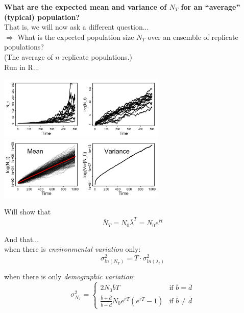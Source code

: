 \documentclass{article}
\newcommand{\note}[1]{\colorbox{gray!20}{#1}}
\newcommand{\ind}{\-\hspace{1cm}}
\begin{document}
\textbf{What are the expected mean and variance of $N_T$ for an ``average'' (typical) population?}\\
That is, we will now ask a different question...\\
\ind $\Rightarrow$ What is the expected population size $N_T$ over an ensemble of replicate populations?\\
\ind (The average of $n$ replicate populations.)\\
\note{Run in R...}
\begin{center}
 \includegraphics[width=8cm]{figs/image1}\\
 \includegraphics[width=8cm]{figs/image2}
\end{center}

Will show that
\begin{equation*}
	\bar{N}_T = N_0 \bar{\lambda}^T = N_0 e^{\bar{r}t}
\end{equation*}

And that...\\
when there is \emph{environmental variation} only:
\begin{equation*}
	\sigma^2_{ln(N_T)}=T \cdot \sigma^2_{ln(\lambda_t)}
\end{equation*}

when there is only \emph{demographic variation}:
\begin{equation*}
  \sigma_{N_T}^2 =
  \begin{cases} 
        2N_0 \bar{b} T & \text{if } \bar{b}=\bar{d} \\
        \frac{\bar{b}+\bar{d}}{\bar{b}-\bar{d}} N_0 e^{\bar{r}T}(e^{\bar{r}T}-1) & \text{if } \bar{b} \neq \bar{d}
    \end{cases}
 \end{equation*}

\pagebreak
\end{document}
